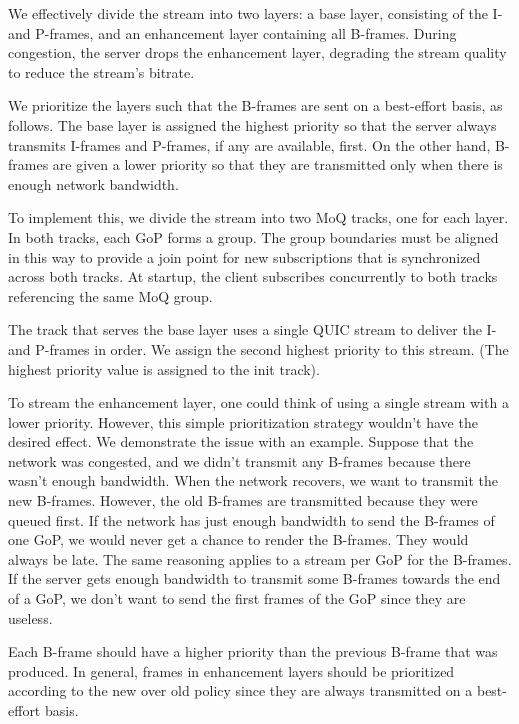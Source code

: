 We effectively divide the stream into two layers: a base layer, consisting of the I- and P-frames, and an enhancement layer containing all B-frames. During congestion, the server drops the enhancement layer, degrading the stream quality to reduce the stream's bitrate.

We prioritize the layers such that the B-frames are sent on a best-effort basis, as follows. The base layer is assigned the highest priority so that the server always transmits I-frames and P-frames, if any are available, first. On the other hand, B-frames are given a lower priority so that they are transmitted only when there is enough network bandwidth.

To implement this, we divide the stream into two MoQ tracks, one for each layer. In both tracks, each GoP forms a group. The group boundaries must be aligned in this way to provide a join point for new subscriptions that is synchronized across both tracks. At startup, the client subscribes concurrently to both tracks referencing the same MoQ group.

The track that serves the base layer uses a single QUIC stream to deliver the I- and P-frames in order. 
We assign the second highest priority to this stream. (The highest priority value is assigned to the
init track).

To stream the enhancement layer, one could think of using a single stream with a lower priority. However, this simple prioritization strategy wouldn't have the desired effect. We demonstrate the issue with an example. Suppose that the network was congested, and we didn't transmit any B-frames because there wasn't enough bandwidth. When the network recovers, we want to transmit the new B-frames. However, the old B-frames are transmitted because they were queued first. If the network has just enough bandwidth to send the B-frames of one GoP, we would never get a chance to render the B-frames. They would always be late. The same reasoning applies to a stream per GoP for the B-frames. If the server gets enough bandwidth to transmit some B-frames towards the end of a GoP, we don't want to send the first frames of the GoP since they are useless. 

Each B-frame should have a higher priority than the previous B-frame that was produced. In general, frames in enhancement layers should be prioritized according to the new over old policy since they are always transmitted on a best-effort basis. 

